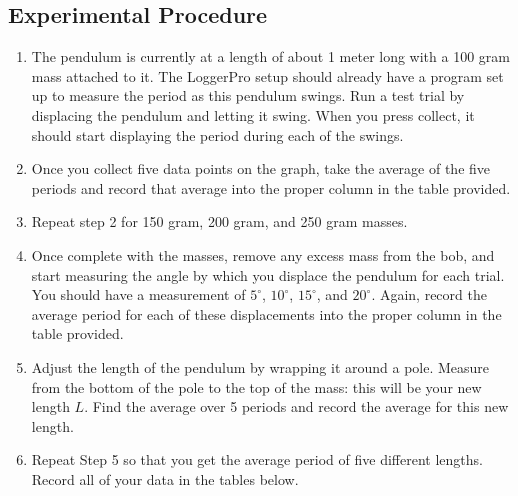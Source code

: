 \documentclass{report}
\begin{document}
    \subsection{Experimental Procedure}
    \begin{enumerate}
        \item The pendulum is currently at a length of about 1 meter long with a 100 gram mass attached to it.
            The LoggerPro setup should already have a program set up to measure the period as this pendulum
            swings. Run a test trial by displacing the pendulum and letting it swing. When you press collect, it
            should start displaying the period during each of the swings.

        \item Once you collect five data points on the graph, take the average of the five periods and record that
            average into the proper column in the table provided.

        \item Repeat step 2 for 150 gram, 200 gram, and 250 gram masses.

        \item Once complete with the masses, remove any excess mass from the bob, and start measuring the angle
            by which you displace the pendulum for each trial. You should have a measurement of \(5^\circ\), \(10^\circ\), \(15^\circ\),
            and \(20^\circ\). Again, record the average period for each of these displacements into the proper column in
            the table provided.

        \item Adjust the length of the pendulum by wrapping it around a pole. Measure from the bottom of the pole
            to the top of the mass: this will be your new length \(L\). Find the average over 5 periods and record the
            average for this new length.

        \item Repeat Step 5 so that you get the average period of five different lengths. Record all of your data in
            the tables below.
    \end{enumerate}

    \pagebreak 
\end{document}
